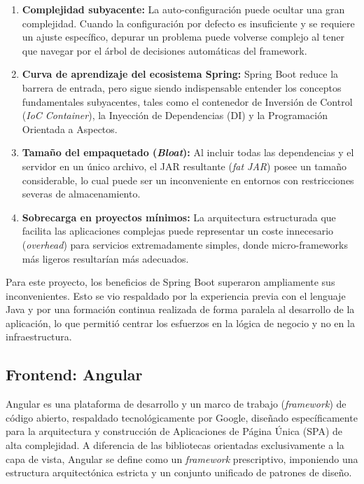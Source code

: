 \begin{enumerate}
    \item \textbf{Complejidad subyacente:} La auto-configuración puede ocultar una gran complejidad. Cuando la configuración por defecto es insuficiente y se requiere un ajuste específico, depurar un problema puede volverse complejo al tener que navegar por el árbol de decisiones automáticas del framework.
    \item \textbf{Curva de aprendizaje del ecosistema Spring:} Spring Boot reduce la barrera de entrada, pero sigue siendo indispensable entender los conceptos fundamentales subyacentes, tales como el contenedor de Inversión de Control (\textit{IoC Container}), la Inyección de Dependencias (DI) y la Programación Orientada a Aspectos.
    \item \textbf{Tamaño del empaquetado (\textit{Bloat}):} Al incluir todas las dependencias y el servidor en un único archivo, el JAR resultante (\textit{fat JAR}) posee un tamaño considerable, lo cual puede ser un inconveniente en entornos con restricciones severas de almacenamiento.
    \item \textbf{Sobrecarga en proyectos mínimos:} La arquitectura estructurada que facilita las aplicaciones complejas puede representar un coste innecesario (\textit{overhead}) para servicios extremadamente simples, donde micro-frameworks más ligeros resultarían más adecuados.
\end{enumerate}

Para este proyecto, los beneficios de Spring Boot superaron ampliamente sus inconvenientes. Esto se vio respaldado por la experiencia previa con el lenguaje Java y por una formación continua realizada de forma paralela al desarrollo de la aplicación, lo que permitió centrar los esfuerzos en la lógica de negocio y no en la infraestructura.

\subsection{Frontend: Angular}
Angular es una plataforma de desarrollo y un marco de trabajo (\textit{framework}) de código abierto, respaldado tecnológicamente por Google, diseñado específicamente para la arquitectura y construcción de Aplicaciones de Página Única (SPA) de alta complejidad. A diferencia de las bibliotecas orientadas exclusivamente a la capa de vista, Angular se define como un \textit{framework} prescriptivo, imponiendo una estructura arquitectónica estricta y un conjunto unificado de patrones de diseño.

